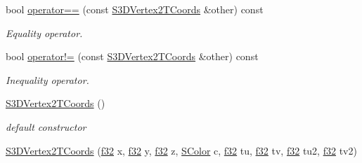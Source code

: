 \begin{DoxyCompactItemize}
\mbox{\label{structirr_1_1video_1_1S3DVertex2TCoords_a98609ec21b65ce72bebbd0be09e8553b}} 
bool \hyperlink{structirr_1_1video_1_1S3DVertex2TCoords_a98609ec21b65ce72bebbd0be09e8553b}{operator==} (const \hyperlink{structirr_1_1video_1_1S3DVertex2TCoords}{S3\+D\+Vertex2\+T\+Coords} \&other) const
\begin{DoxyCompactList}\small\item\em Equality operator. \end{DoxyCompactList}\item 
\mbox{\label{structirr_1_1video_1_1S3DVertex2TCoords_a0ea9fd4f215bc4677cd192fc0dc31376}} 
bool \hyperlink{structirr_1_1video_1_1S3DVertex2TCoords_a0ea9fd4f215bc4677cd192fc0dc31376}{operator!=} (const \hyperlink{structirr_1_1video_1_1S3DVertex2TCoords}{S3\+D\+Vertex2\+T\+Coords} \&other) const
\begin{DoxyCompactList}\small\item\em Inequality operator. \end{DoxyCompactList}\item 
\mbox{\label{structirr_1_1video_1_1S3DVertex2TCoords_a576818fd5d7b120a8266a5f0f6ea8215}} 
\hyperlink{structirr_1_1video_1_1S3DVertex2TCoords_a576818fd5d7b120a8266a5f0f6ea8215}{S3\+D\+Vertex2\+T\+Coords} ()
\begin{DoxyCompactList}\small\item\em default constructor \end{DoxyCompactList}\item 
\mbox{\label{structirr_1_1video_1_1S3DVertex2TCoords_a8a1284825d35ca6448f694688ba2337b}} 
\hyperlink{structirr_1_1video_1_1S3DVertex2TCoords_a8a1284825d35ca6448f694688ba2337b}{S3\+D\+Vertex2\+T\+Coords} (\hyperlink{namespaceirr_a0277be98d67dc26ff93b1a6a1d086b07}{f32} x, \hyperlink{namespaceirr_a0277be98d67dc26ff93b1a6a1d086b07}{f32} y, \hyperlink{namespaceirr_a0277be98d67dc26ff93b1a6a1d086b07}{f32} z, \hyperlink{classirr_1_1video_1_1SColor}{S\+Color} c, \hyperlink{namespaceirr_a0277be98d67dc26ff93b1a6a1d086b07}{f32} tu, \hyperlink{namespaceirr_a0277be98d67dc26ff93b1a6a1d086b07}{f32} tv, \hyperlink{namespaceirr_a0277be98d67dc26ff93b1a6a1d086b07}{f32} tu2, \hyperlink{namespaceirr_a0277be98d67dc26ff93b1a6a1d086b07}{f32} tv2)

\end{DoxyCompactItemize}
